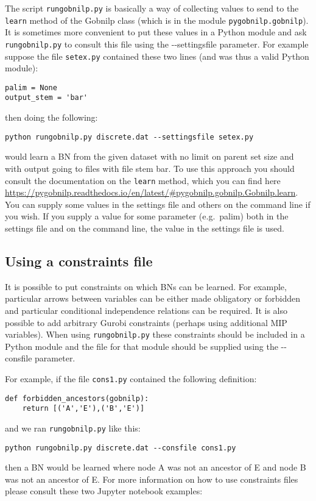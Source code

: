 \documentclass{article}
\begin{document}
The script \texttt{rungobnilp.py} is basically a way of collecting
values to send to the \texttt{learn} method of the Gobnilp class (which is in
the module \texttt{pygobnilp.gobnilp}). It is sometimes more
convenient to put these values in a Python module and ask
\texttt{rungobnilp.py} to consult this file using the -{}-settingsfile
parameter. For example suppose the file \texttt{setex.py} contained
these two lines (and was thus a valid Python module):
\begin{verbatim}
palim = None
output_stem = 'bar'
\end{verbatim}
then doing the following:
\begin{verbatim}
python rungobnilp.py discrete.dat --settingsfile setex.py
\end{verbatim}
would learn a BN from the given dataset with no limit on parent set
size and with output going to files with file stem bar. To use this
approach you should consult the documentation on the \texttt{learn}
method, which you can find here
\url{https://pygobnilp.readthedocs.io/en/latest/#pygobnilp.gobnilp.Gobnilp.learn}. You
can supply some values in the settings file and others on the command
line if you wish. If you supply a value for some parameter (e.g.\
palim) both in the settings file and on the command line, the value in
the settings file is used.

\subsection{Using a constraints file}
\label{sec:constraints}

It is possible to put constraints on which BNs can be learned. For
example, particular arrows between variables can be either made
obligatory or forbidden and particular conditional independence
relations can be required. It is also possible to add arbitrary Gurobi
constraints (perhaps using additional MIP variables). When using
\texttt{rungobnilp.py} these constraints should be included in a
Python module and the file for that module should be supplied using
the -{}-consfile parameter.

For example, if the file \texttt{cons1.py} contained the following definition:
\begin{verbatim}
def forbidden_ancestors(gobnilp):
    return [('A','E'),('B','E')]
\end{verbatim}
and we ran \texttt{rungobnilp.py} like this:
\begin{verbatim}
python rungobnilp.py discrete.dat --consfile cons1.py
\end{verbatim}
then a BN would be learned where node A was not an ancestor of E and
node B was not an ancestor of E. For more information on how to use
constraints files please consult these two Jupyter notebook examples:
\end{document}
